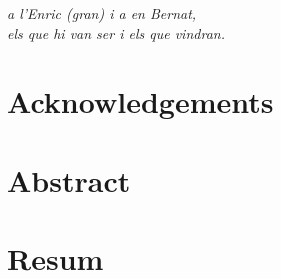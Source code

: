 \cleartorecto
\thispagestyle{empty}
\vspace*{3cm}
\begin{flushright}
\textit{a l'Enric (gran) i a en Bernat,\\
els que hi van ser i els que vindran.}
\end{flushright}


\cleartorecto
\chapter*{Acknowledgements}



\cleartorecto
\chapter{Abstract}



\cleartorecto
\chapter*{Resum}



% 


